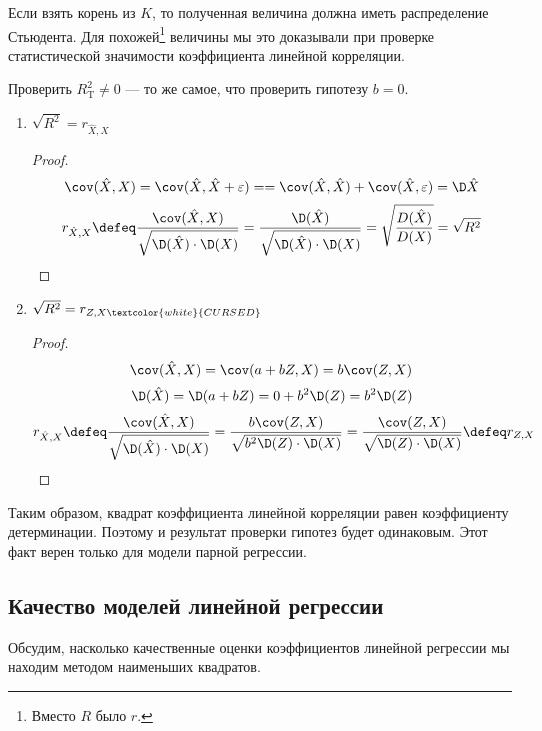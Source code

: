 Если взять корень из \(K\), то полученная величина должна иметь распределение Стьюдента. Для похожей\footnote{Вместо \(R\) было \(r\).} величины мы это доказывали при проверке статистической значимости коэффициента линейной корреляции.

Проверить \(R^2_{\mathrm{T}} \neq 0\) --- то же самое, что проверить гипотезу \(b = 0\).

\begin{enumerate}
    \item \(\sqrt{R^2} = r_{ \hat{X}, X}\)
          \begin{proof}
              \[\cov(\hat{X}, X) = \cov(\hat{X}, \hat{X} + \varepsilon) = = \cov( \hat{X}, \hat{X}) + \cov( \hat{X}, \varepsilon) = \D \hat{X}\]
              \[r_{ \hat{X}, X} \defeq \frac{\cov( \hat{X}, X)}{\sqrt{\D(\hat{X}) \cdot \D(X)}} = \frac{\D(\hat{X})}{\sqrt{\D(\hat{X}) \cdot \D(X)}} = \sqrt{\frac{D(\hat{X})}{D(X)}} = \sqrt{R^2}\]
          \end{proof}
    \item \(\sqrt{R^2} = r_{Z, X\textcolor{white}{CURSED}}\)
          \begin{proof}
              \[\cov( \hat{X}, X) = \cov(a + bZ, X) = b\cov(Z, X)\]
              \[\D( \hat{X}) = \D(a + bZ) = 0 + b^2 \D(Z) = b^2 \D(Z)\]
              \[r_{ \hat{X}, X} \defeq \frac{\cov( \hat{X}, X)}{\sqrt{\D(\hat{X}) \cdot \D(X)}} = \frac{b\cov(Z, X)}{\sqrt{b^2\D(Z) \cdot \D(X)}} = \frac{\cov(Z, X)}{\sqrt{\D(Z) \cdot \D(X)}} \defeq r_{Z, X}\]
          \end{proof}
\end{enumerate}

Таким образом, квадрат коэффициента линейной корреляции равен коэффициенту детерминации. Поэтому и результат проверки гипотез будет одинаковым. Этот факт верен только для модели парной регрессии.

\subsection{Качество моделей линейной регрессии}

Обсудим, насколько качественные оценки коэффициентов линейной регрессии мы находим методом наименьших квадратов.

